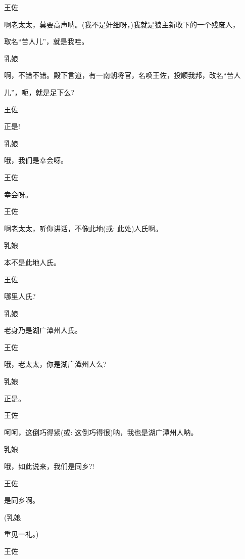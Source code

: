{{{王佐

啊老太太，莫要高声呐。(我不是奸细呀，)我就是狼主新收下的一个残废人，

取名``苦人儿''，就是我哇。}

{乳娘

啊，不错不错。殿下言道，有一南朝将官，名唤王佐，投顺我邦，改名``苦人

儿''，呃，就是足下么?}

{王佐\hspace{30pt}~

正是!}

{乳娘\hspace{30pt}~

哦，我们是幸会呀。}

{王佐\hspace{30pt}~

幸会呀。}

{王佐\hspace{30pt}~

啊老太太，听你讲话，不像此地({\akai 或}: 此处)人氏啊。}

{乳娘\hspace{30pt}~

本不是此地人氏。}

{王佐\hspace{30pt}~

哪里人氏?}

{乳娘\hspace{30pt}~

老身乃是湖广潭州人氏。}

{王佐\hspace{30pt}~

哦，老太太，你是湖广潭州人么?}

{乳娘\hspace{30pt}~

正是。}

{王佐\hspace{30pt}~

呵呵，这倒巧得紧({\akai 或}: 这倒巧得很)呐，我也是湖广潭州人呐。}

{乳娘\hspace{30pt}~

哦，如此说来，我们是同乡?!}

{王佐\hspace{30pt}~

是同乡啊。}

{(乳娘\hspace{30pt}~

重见一礼。)}

{王佐\hspace{30pt}~

}}}
